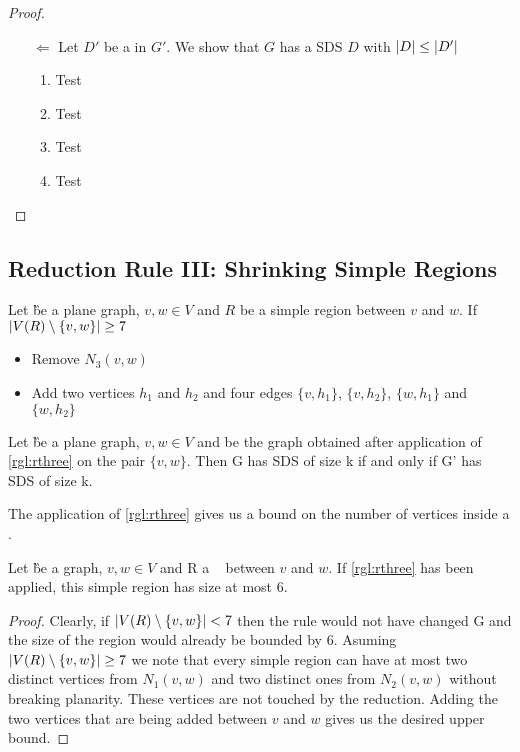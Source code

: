 \begin{proof}
\begin{enumerate}
        \item[$\Leftarrow$] Let $D'$ be a \sdom in $G'$. We show that $G$ has a SDS $D$ with $\abs{D} \leq \abs{D'}$
        \begin{enumerate}
            \item  Test
            \item  Test
            \item  Test
            \item Test
        \end{enumerate} 
    \end{enumerate}

\end{proof}
\subsection{Reduction Rule III: Shrinking Simple Regions}


\begin{rgl}\label{rgl:rthree}
    Let \G be a plane graph, $v, w \in V$ and $R$ be a simple region between $v$ and $w$. If $\abs{V(R) \setminus \{v, w\}} \geq 7$
    \begin{itemize}
        \item Remove $N_3(v,w)$
        \item Add two vertices $h_1$ and $h_2$ and four edges $\{v, h_1\}$, $\{v, h_2\}$, $\{w, h_1\}$ and $\{w, h_2\}$
    \end{itemize}
\end{rgl}
\begin{lemma}\label{lemma:correctnessthree}
    Let \G be a plane graph, $v, w \in V$ and \GB be the graph obtained after application of \cref{rgl:rthree} on the pair $\{v, w\}$. Then G has SDS of size k if and only if G' has SDS of size k.
\end{lemma}

The application of \cref{rgl:rthree} gives us a bound on the number of vertices inside a \sr. 
\begin{corollary}\label{lemma:simpleregionbound}
    Let \G be a graph, $v, w\in V$ and R a \sr~ between $v$ and $w$. If \cref{rgl:rthree} has been applied, this simple region has size at most 6.
\end{corollary}
\begin{proof}
    Clearly, if $\abs{V(R) \setminus \{v, w\}} < 7$ then the rule would not have changed G and the size of the region would already be bounded by 6.
    Asuming $\abs{V(R) \setminus \{v, w\}} \geq 7$ we note that every simple region can have at most two distinct vertices from $N_1(v,w)$ and two distinct ones from $N_2(v,w)$ without breaking planarity. These vertices are not touched by the reduction. Adding the two vertices that are being added between $v$ and $w$ gives us the desired upper bound.
\end{proof}


